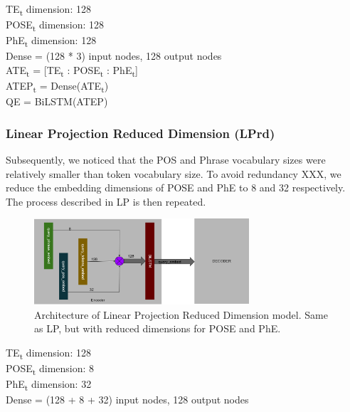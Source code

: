 \documentclass{IEEEtran}
\begin{document}
        \hspace*{-3.5mm}TE\textsubscript{t} dimension: 128 \\
        POSE\textsubscript{t} dimension: 128 \\
        PhE\textsubscript{t} dimension: 128 \\
        Dense = (128 * 3) input nodes, 128 output nodes \\ 

        \hspace*{-3.5mm}ATE\textsubscript{t} = [TE\textsubscript{t} : 
        POSE\textsubscript{t} : PhE\textsubscript{t}] \\
        ATEP\textsubscript{t} = Dense(ATE\textsubscript{t}) \\
        QE = BiLSTM(ATEP) \\

        \subsubsection{Linear Projection Reduced Dimension (LPrd)} 
        Subsequently, we noticed that the POS and Phrase vocabulary sizes were relatively smaller
        than token vocabulary size. To avoid redundancy XXX, we reduce the embedding dimensions
        of POSE and PhE to 8 and 32 respectively. The process described in LP is then repeated. \\

        \begin{figure}[h]
          \centering
          \includegraphics[width=8cm]{lprd.png}
          \caption{Architecture of Linear Projection Reduced Dimension model. Same as LP, but with
          reduced dimensions for POSE and PhE.}
          \label{fig:lprd}
        \end{figure}

        \hspace*{-3.5mm}TE\textsubscript{t} dimension: 128 \\
        POSE\textsubscript{t} dimension: 8 \\
        PhE\textsubscript{t} dimension: 32 \\
        Dense = (128 + 8 + 32) input nodes, 128 output nodes \\ 
\end{document}
